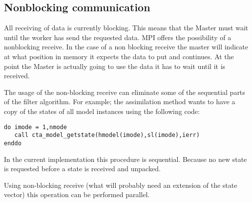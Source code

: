 \subsection{Nonblocking communication} \label{Sec:Nonblocking}
All receiving of data is currently blocking. This means that the Master
must wait until the worker has send the requested data. MPI offers the
possibility of a nonblocking receive. In the case of a non blocking receive
the master will indicate at what position in memory it expects the data to
put and continues. At the point the Master is actually going to use the
data it has to wait until it is received. 

The usage of the non-blocking receive can eliminate some of the sequential
parts of the filter algorithm. For example; the assimilation method wants
to have a copy of the states of all model instances using the following
code:

\begin{verbatim}
do imode = 1,nmode
   call cta_model_getstate(hmodel(imode),sl(imode),ierr)
enddo
\end{verbatim}
In the current implementation this procedure is sequential. Because no new
state is requested before a state is received and unpacked.

Using non-blocking receive (what will probably need an extension of the
state vector) this operation can be performed parallel.


